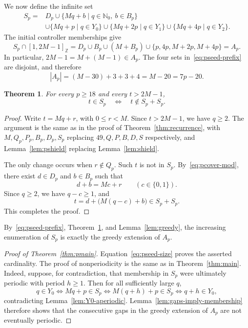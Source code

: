 \documentclass[11pt,letterpaper]{article}
\newtheorem{theorem}{Theorem}[section]
\newcommand{\Nzero}{\mathbb{N}_0}
\newcommand{\ints}[2]{[#1,#2]_{\mathbb{Z}}}
\begin{document}
We now define the infinite set
\begin{equation}
\begin{split}
S_p={}&D_p\cup\{Mq+b\mid q\in\Nzero,\ b\in B_p\}\\
&\cup\{Mq+p\mid q\in Y_0\}
 \cup\{Mq+2p\mid q\in Y_1\}
 \cup\{Mq+4p\mid q\in Y_2\}.
\end{split}
\end{equation}
The initial controller memberships give
\begin{equation}\label{eq:pseed-prefix}
S_p\cap\ints{1}{2M-1}
=D_p\cup B_p\cup(M+B_p)\cup\{p,4p,M+2p,M+4p\}=A_p.
\end{equation}
In particular, \(2M-1=M+(M-1)\in A_p\). The four sets in~\eqref{eq:pseed-prefix} are disjoint, and therefore
\begin{equation}\label{eq:pseed-size}
|A_p|=(M-30)+3+3+4=M-20=7p-20.
\end{equation}

\begin{theorem}\label{thm:precurrence}
For every \(p\geq18\) and every \(t>2M-1\),
\begin{equation}
t\in S_p
\quad\Longleftrightarrow\quad
t\notin S_p+S_p.
\end{equation}
\end{theorem}

\begin{proof}
Write \(t=Mq+r\), with \(0\leq r<M\). Since \(t>2M-1\), we have \(q\geq2\). The argument is the same as in the proof of Theorem~\ref{thm:recurrence}, with \(M,Q_p,P_p,B_p,D_p,S_p\) replacing \(49,Q,P,B,D,S\) respectively, and Lemma~\ref{lem:pshield} replacing Lemma~\ref{lem:shield}. 

The only change occurs when \(r\notin Q_p\). Such \(t\) is not in \(S_p\). By~\eqref{eq:pcover-mod}, there exist \(d\in D_p\) and \(b\in B_p\) such that
\[
d+b=Mc+r
\qquad(c\in\{0,1\}).
\]
Since \(q\geq2\), we have \(q-c\geq1\), and
\[
t=d+\bigl(M(q-c)+b\bigr)\in S_p+S_p.
\]
This completes the proof.
\end{proof}

By~\eqref{eq:pseed-prefix}, Theorem~\ref{thm:precurrence}, and Lemma~\ref{lem:greedy}, the increasing enumeration of \(S_p\) is exactly the greedy extension of \(A_p\).

\begin{proof}[Proof of Theorem~\ref{thm:pmain}]
Equation~\eqref{eq:pseed-size} proves the asserted cardinality. The proof of nonperiodicity is the same as in Theorem~\ref{thm:main}. Indeed, suppose, for contradiction, that membership in \(S_p\) were ultimately periodic with period \(h\geq1\). Then for all sufficiently large \(q\),
\[
q\in Y_0
\iff Mq+p\in S_p
\iff M(q+h)+p\in S_p
\iff q+h\in Y_0,
\]
contradicting Lemma~\ref{lem:Y0-aperiodic}. Lemma~\ref{lem:gaps-imply-membership} therefore shows that the consecutive gaps in the greedy extension of \(A_p\) are not eventually periodic.
\end{proof}
\end{document}
